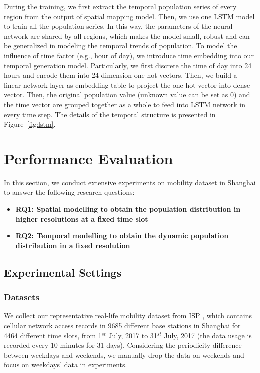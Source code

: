 \documentclass[letterpaper]{article} %
\begin{document}
During the training, we first extract the temporal population series of every region from the output of spatial mapping model. Then, we use one LSTM model to train all the population series. In this way, the parameters of the neural network are shared by all regions, which makes the model small, robust and can be generalized in modeling the temporal trends of population. To model the influence of time factor (e.g., hour of day), we introduce time embedding into our temporal generation model. Particularly, we first discrete the time of day into 24 hours and encode them into 24-dimension one-hot vectors. Then, we build a linear network layer as embedding table to project the one-hot vector into dense vector. 
Then, the original population value (unknown value can be set as 0) and the time vector are grouped together as a whole to feed into LSTM network in every time step. The details of the temporal structure is presented in Figure~\ref{fig:lstm}.





\section{Performance Evaluation}

In this section, we conduct extensive experiments on mobility dataset in Shanghai to answer the following research questions:

\begin{itemize}

    \item \textbf{RQ1: Spatial modelling to obtain the population distribution in higher resolutions at a fixed time slot} 

    \item \textbf{RQ2: Temporal modelling to obtain the dynamic population distribution in a fixed resolution}

\end{itemize}

\subsection{Experimental Settings}

\subsubsection{Datasets}

We collect our representative real-life mobility dataset from ISP , which contains cellular network access records in 9685 different base stations in Shanghai for 4464 different time slots, from 1$^{st}$ July, 2017 to 31$^{st}$ July, 2017 (the data usage is recorded every 10 minutes for 31 days). Considering the periodicity difference between weekdays and weekends, we manually drop the data on weekends and focus on weekdays' data in experiments. 
\end{document}
